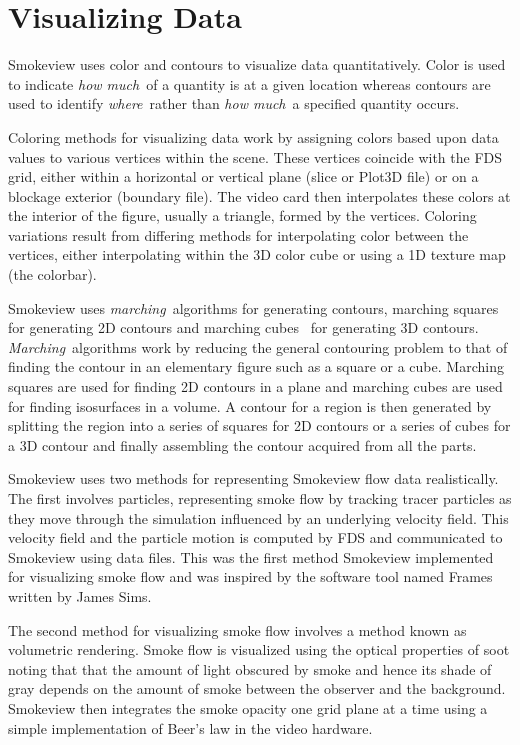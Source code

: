 \documentclass[11pt,twoside]{book}
\begin{document}
%
%

\chapter{Visualizing Data}
Smokeview uses color and contours to visualize data
quantitatively. Color is used to indicate {\em how much}\ of a
quantity is at a given location whereas contours are used to
identify {\em where}\ rather than {\em how much}\ a specified
quantity occurs.

Coloring methods for visualizing data work by assigning colors
based upon data values to various vertices within the scene. These
vertices coincide with the FDS grid, either within a horizontal or
vertical plane (slice or Plot3D file) or on a blockage exterior
(boundary file).  The video card then interpolates these colors at
the interior of the figure, usually a triangle, formed by the
vertices. Coloring variations result from differing methods for
interpolating color between the vertices, either interpolating
within the 3D color cube or using a 1D texture map (the colorbar).

Smokeview uses {\em marching}\ algorithms for generating contours,
marching squares for generating 2D contours and marching
cubes~\cite{marchingcubes} for generating 3D contours. {\em
Marching}\ algorithms work by reducing the general contouring
problem to that of finding the contour in an elementary figure
such as a square or a cube.  Marching squares are used for finding
2D contours in a plane and marching cubes are used for finding
isosurfaces in a volume. A contour for a region is then generated
by splitting the region into a series of squares for 2D contours
or a series of cubes for a 3D contour and finally assembling the
contour acquired from all the parts.

Smokeview uses two methods for representing Smokeview flow data
realistically.  The first involves particles, representing smoke
flow by tracking tracer particles as they move through the
simulation influenced by an underlying  velocity field.  This
velocity field and the particle motion is computed by FDS and
communicated to Smokeview using data files.  This was the first
method Smokeview implemented for visualizing smoke flow and was
inspired by the software tool named Frames written by James Sims.

The second method for visualizing smoke flow involves a method
known as volumetric rendering.  Smoke flow is visualized using the
optical properties of soot noting that that the amount of light
obscured by smoke and hence its shade of gray depends on the
amount of smoke between the observer and the background. Smokeview
then integrates the smoke opacity one grid plane at a time using a
simple implementation of Beer's law in the video hardware.
\end{document}
